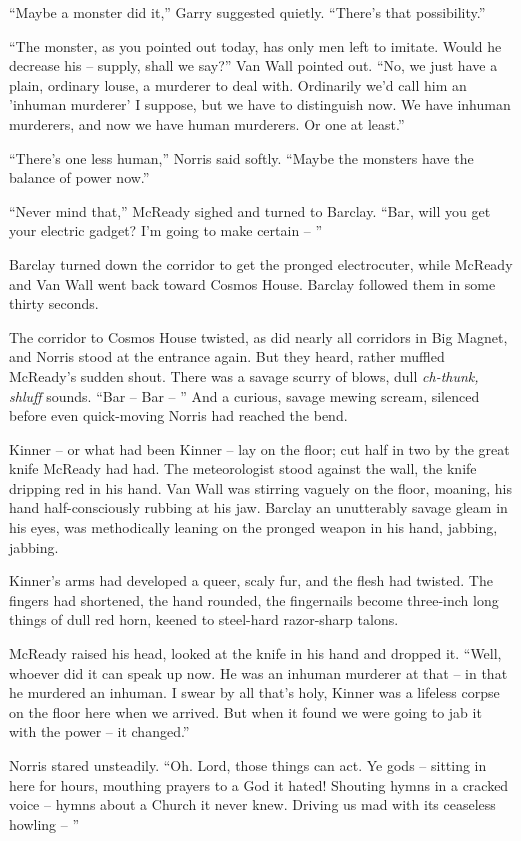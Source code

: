 \documentclass[letterpaper,openany,12pt]{memoir}		%
\begin{document}
``Maybe a monster did it,'' Garry suggested quietly. ``There's that
possibility.''

``The monster, as you pointed out today, has only men left to imitate. Would he
decrease his -- supply, shall we say?'' Van Wall pointed out. ``No, we just have
a plain, ordinary louse, a murderer to deal with. Ordinarily we'd call him an
'inhuman murderer' I suppose, but we have to distinguish now. We have inhuman
murderers, and now we have human murderers. Or one at least.''

``There's one less human,'' Norris said softly. ``Maybe the monsters have the
balance of power now.''

``Never mind that,'' McReady sighed and turned to Barclay. ``Bar, will you get
your electric gadget? I'm going to make certain -- ''

Barclay turned down the corridor to get the pronged electrocuter, while McReady
and Van Wall went back toward Cosmos House. Barclay followed them in some thirty
seconds.

The corridor to Cosmos House twisted, as did nearly all corridors in Big Magnet,
and Norris stood at the entrance again. But they heard, rather muffled McReady's
sudden shout. There was a savage scurry of blows, dull \emph{ch-thunk, shluff}
sounds. ``Bar -- Bar -- '' And a curious, savage mewing scream, silenced before
even quick-moving Norris had reached the bend.

Kinner -- or what had been Kinner -- lay on the floor; cut half in two by the
great knife McReady had had. The meteorologist stood against the wall, the knife
dripping red in his hand. Van Wall was stirring vaguely on the floor, moaning,
his hand half-consciously rubbing at his jaw. Barclay an unutterably savage
gleam in his eyes, was methodically leaning on the pronged weapon in his hand,
jabbing, jabbing.

Kinner's arms had developed a queer, scaly fur, and the flesh had twisted. The
fingers had shortened, the hand rounded, the fingernails become three-inch long
things of dull red horn, keened to steel-hard razor-sharp talons.

McReady raised his head, looked at the knife in his hand and dropped it. ``Well,
whoever did it can speak up now. He was an inhuman murderer at that -- in that
he murdered an inhuman. I swear by all that's holy, Kinner was a lifeless corpse
on the floor here when we arrived. But when it found we were going to jab it
with the power -- it changed.''

Norris stared unsteadily. ``Oh. Lord, those things can act. Ye gods -- sitting
in here for hours, mouthing prayers to a God it hated! Shouting hymns in a
cracked voice -- hymns about a Church it never knew. Driving us mad with its
ceaseless howling -- ''
\end{document}

